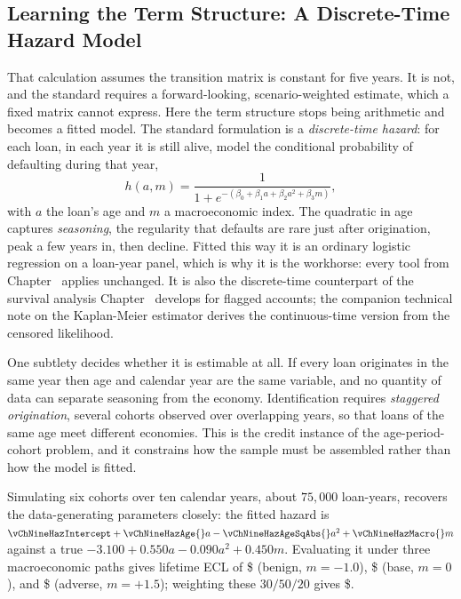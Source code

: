 \documentclass[../ai_in_finance]{subfiles}
\begin{document}
\subsection{Learning the Term Structure: A Discrete-Time Hazard Model}
\label{sec:hazard-term-structure}

That calculation assumes the transition matrix is constant for five years. It is not, and the standard requires a forward-looking, scenario-weighted estimate, which a fixed matrix cannot express. Here the term structure stops being arithmetic and becomes a fitted model. The standard formulation is a \emph{discrete-time hazard}: for each loan, in each year it is still alive, model the conditional probability of defaulting during that year,
\begin{equation}
\label{eq:creditrisk-discrete-hazard}
h(a,m) = \frac{1}{1+e^{-(\beta_0+\beta_1 a+\beta_2 a^2+\beta_3 m)}},
\end{equation}
with $a$ the loan's age and $m$ a macroeconomic index. The quadratic in age captures \emph{seasoning}, the regularity that defaults are rare just after origination, peak a few years in, then decline. Fitted this way it is an ordinary logistic regression on a loan-year panel, which is why it is the workhorse: every tool from Chapter~ applies unchanged. It is also the discrete-time counterpart of the survival analysis Chapter~ develops for flagged accounts; the companion technical note on the Kaplan-Meier estimator derives the continuous-time version from the censored likelihood.

One subtlety decides whether it is estimable at all. If every loan originates in the same year then age and calendar year are the same variable, and no quantity of data can separate seasoning from the economy. Identification requires \emph{staggered origination}, several cohorts observed over overlapping years, so that loans of the same age meet different economies. This is the credit instance of the age-period-cohort problem, and it constrains how the sample must be assembled rather than how the model is fitted.

Simulating six cohorts over ten calendar years, about $75{,}000$ loan-years, recovers the data-generating parameters closely: the fitted hazard is $\vChNineHazIntercept+\vChNineHazAge{}a-\vChNineHazAgeSqAbs{}a^2+\vChNineHazMacro{}m$ against a true $-3.100+0.550a-0.090a^2+0.450m$. Evaluating it under three macroeconomic paths gives lifetime ECL of \$\vChNineHazECLBenign{} (benign, $m=-1.0$), \$\vChNineHazECLBase{} (base, $m=0$), and \$\vChNineHazECLAdverse{} (adverse, $m=+1.5$); weighting these $30/50/20$ gives \$\vChNineHazECLWeighted.
\end{document}
